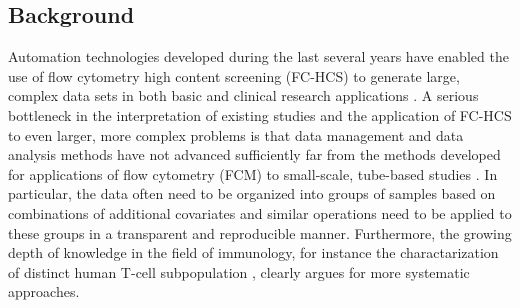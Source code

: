 \documentclass[10pt]{bmc_article}
\newenvironment{bmcformat}{\begin{raggedright}\baselineskip20pt\sloppy\setboolean{publ}{false}}{\end{raggedright}\baselineskip20pt\sloppy}
\begin{document}
\begin{bmcformat}
\begin{abstract}
\end{abstract}











\section*{Background}
Automation technologies developed during the last several years have
enabled the use of flow cytometry high content screening (FC-HCS) to
generate large, complex data sets in both basic and clinical research
applications \cite{brinkman2007hcf}. A serious bottleneck in the
interpretation of existing studies and the application of FC-HCS to
even larger, more complex problems is that data management and data
analysis methods have not advanced sufficiently far from the methods
developed for applications of flow cytometry (FCM) to small-scale,
tube-based studies \cite{mahnke2007omi}. In particular, the data often
need to be organized into groups of samples based on combinations of
additional covariates and similar operations need to be applied to
these groups in a transparent and reproducible manner. Furthermore,
the growing depth of knowledge in the field of immunology, for
instance the charactarization of distinct human T-cell subpopulation
\cite{Appay}, clearly argues for more systematic approaches.


\end{bmcformat}
\end{document}
